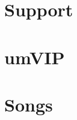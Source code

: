 \documentclass[8pt]{book}
\begin{document}
\setlength{\tabcolsep}{10pt}
\begin{multicols*}{2}
 \let\mcnewpage=\newpage
     \makeatletter
     \renewcommand\newpage{
           \if@firstcolumn
                \hrule width \linewidth height0pt
                \columnbreak
            \else
                \mcnewpage
            \fi}

\end{multicols*}


\chapter{Support}

\begin{multicols*}{2}
 \let\mcnewpage=\newpage
     \makeatletter
     \renewcommand\newpage{
           \if@firstcolumn
                \hrule width \linewidth height0pt
                \columnbreak
            \else
                \mcnewpage
            \fi}

\end{multicols*}

\chapter{umVIP}

\begin{multicols*}{2}
 \let\mcnewpage=\newpage
     \makeatletter
     \renewcommand\newpage{
           \if@firstcolumn
                \hrule width \linewidth height0pt
                \columnbreak
            \else
                \mcnewpage
            \fi}

\end{multicols*}

\chapter{Songs}

\setlength{\columnseprule}{0.5pt}
\setlength{\tabcolsep}{3pt}
\begin{multicols*}{4}
 \let\mcnewpage=\newpage
     \makeatletter
     \renewcommand\newpage{
           \if@firstcolumn
                \hrule width \linewidth height0pt
                \columnbreak
            \else
                \mcnewpage
            \fi}
\begin{footnotesize}

\end{footnotesize}
\end{multicols*}
\end{document}
